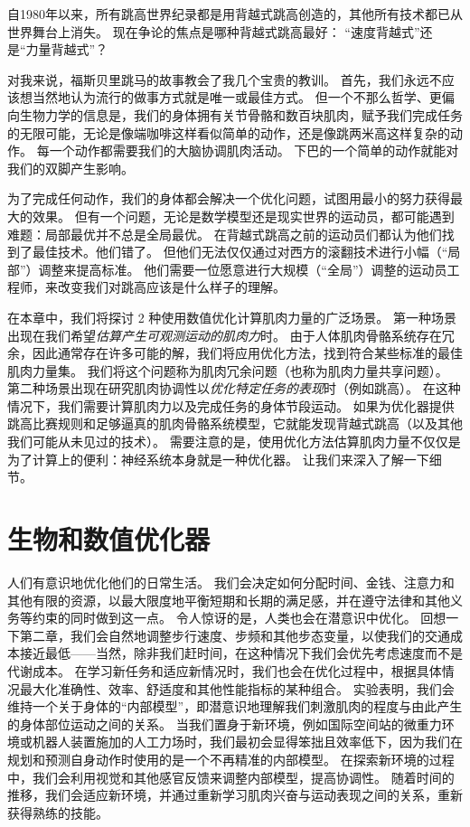 自1980年以来，所有跳高世界纪录都是用背越式跳高创造的，其他所有技术都已从世界舞台上消失。
现在争论的焦点是哪种背越式跳高最好：
“速度背越式”还是“力量背越式”？


对我来说，福斯贝里跳马的故事教会了我几个宝贵的教训。
首先，我们永远不应该想当然地认为流行的做事方式就是唯一或最佳方式。
但一个不那么哲学、更偏向生物力学的信息是，我们的身体拥有关节骨骼和数百块肌肉，赋予我们完成任务的无限可能，无论是像端咖啡这样看似简单的动作，还是像跳两米高这样复杂的动作。
每一个动作都需要我们的大脑协调肌肉活动。
下巴的一个简单的动作就能对我们的双脚产生影响。


为了完成任何动作，我们的身体都会解决一个优化问题，试图用最小的努力获得最大的效果。
但有一个问题，无论是数学模型还是现实世界的运动员，都可能遇到难题：局部最优并不总是全局最优。
在背越式跳高之前的运动员们都认为他们找到了最佳技术。他们错了。
但他们无法仅仅通过对西方的滚翻技术进行小幅（“局部”）调整来提高标准。
他们需要一位愿意进行大规模（“全局”）调整的运动员工程师，来改变我们对跳高应该是什么样子的理解。


在本章中，我们将探讨 2 种使用数值优化计算肌肉力量的广泛场景。
第一种场景出现在我们希望\textit{估算产生可观测运动的肌肉力}时。
由于人体肌肉骨骼系统存在冗余，因此通常存在许多可能的解，我们将应用优化方法，找到符合某些标准的最佳肌肉力量集。
我们将这个问题称为肌肉冗余问题（也称为肌肉力量共享问题）。
第二种场景出现在研究肌肉协调性以\textit{优化特定任务的表现}时（例如跳高）。
在这种情况下，我们需要计算肌肉力以及完成任务的身体节段运动。
如果为优化器提供跳高比赛规则和足够逼真的肌肉骨骼系统模型，它就能发现背越式跳高（以及其他我们可能从未见过的技术）。
需要注意的是，使用优化方法估算肌肉力量不仅仅是为了计算上的便利：神经系统本身就是一种优化器。
让我们来深入了解一下细节。


\section{生物和数值优化器}

人们有意识地优化他们的日常生活。
我们会决定如何分配时间、金钱、注意力和其他有限的资源，以最大限度地平衡短期和长期的满足感，并在遵守法律和其他义务等约束的同时做到这一点。
令人惊讶的是，人类也会在潜意识中优化。
回想一下第二章，我们会自然地调整步行速度、步频和其他步态变量，以使我们的交通成本接近最低——当然，除非我们赶时间，在这种情况下我们会优先考虑速度而不是代谢成本。
在学习新任务和适应新情况时，我们也会在优化过程中，根据具体情况最大化准确性、效率、舒适度和其他性能指标的某种组合。
实验表明，我们会维持一个关于身体的“内部模型”，即潜意识地理解我们刺激肌肉的程度与由此产生的身体部位运动之间的关系。
当我们置身于新环境，例如国际空间站的微重力环境或机器人装置施加的人工力场时，我们最初会显得笨拙且效率低下，因为我们在规划和预测自身动作时使用的是一个不再精准的内部模型。
在探索新环境的过程中，我们会利用视觉和其他感官反馈来调整内部模型，提高协调性。
随着时间的推移，我们会适应新环境，并通过重新学习肌肉兴奋与运动表现之间的关系，重新获得熟练的技能。


